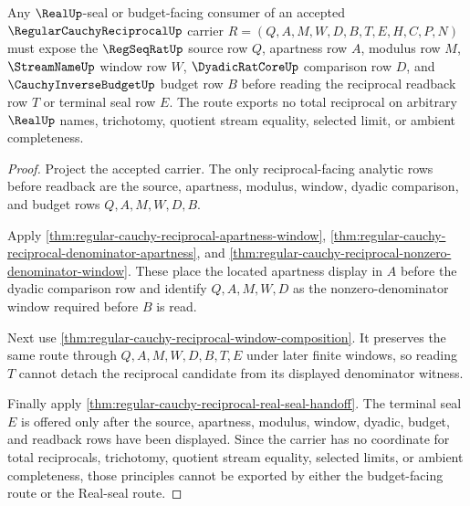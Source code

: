 \begin{theorem}
\label{thm:regularcauchyreciprocal-located-apartness-window}
Any $\RealUp$-seal or budget-facing consumer of an accepted $\RegularCauchyReciprocalUp$ carrier $R=(Q,A,M,W,D,B,T,E,H,C,P,N)$ must expose the $\RegSeqRatUp$ source row $Q$, apartness row $A$, modulus row $M$, $\StreamNameUp$ window row $W$, $\DyadicRatCoreUp$ comparison row $D$, and $\CauchyInverseBudgetUp$ budget row $B$ before reading the reciprocal readback row $T$ or terminal seal row $E$. The route exports no total reciprocal on arbitrary $\RealUp$ names, trichotomy, quotient stream equality, selected limit, or ambient completeness.
\end{theorem}
\begin{proof}
Project the accepted carrier. The only reciprocal-facing analytic rows before readback are the source, apartness, modulus, window, dyadic comparison, and budget rows $Q,A,M,W,D,B$.

Apply \autoref{thm:regular-cauchy-reciprocal-apartness-window}, \autoref{thm:regular-cauchy-reciprocal-denominator-apartness}, and \autoref{thm:regular-cauchy-reciprocal-nonzero-denominator-window}. These place the located apartness display in $A$ before the dyadic comparison row and identify $Q,A,M,W,D$ as the nonzero-denominator window required before $B$ is read.

Next use \autoref{thm:regular-cauchy-reciprocal-window-composition}. It preserves the same route through $Q,A,M,W,D,B,T,E$ under later finite windows, so reading $T$ cannot detach the reciprocal candidate from its displayed denominator witness.

Finally apply \autoref{thm:regular-cauchy-reciprocal-real-seal-handoff}. The terminal seal $E$ is offered only after the source, apartness, modulus, window, dyadic, budget, and readback rows have been displayed. Since the carrier has no coordinate for total reciprocals, trichotomy, quotient stream equality, selected limits, or ambient completeness, those principles cannot be exported by either the budget-facing route or the Real-seal route.
\end{proof}

